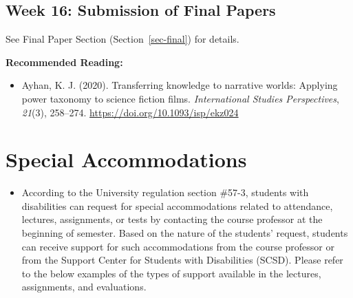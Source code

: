 \documentclass[
  letterpaper,
  DIV=11,
  numbers=noendperiod]{scrartcl}
\providecommand{\tightlist}{%
  \setlength{\itemsep}{0pt}\setlength{\parskip}{0pt}}\usepackage{longtable,booktabs,array}
\begin{document}
\hypertarget{week-16-submission-of-final-papers}{%
\subsection*{Week 16: Submission of Final
Papers}\label{week-16-submission-of-final-papers}}

See Final Paper Section (Section~\ref{sec-final}) for details.

\textbf{Recommended Reading:}

\begin{itemize}
\tightlist
\item
  Ayhan, K. J. (2020). Transferring knowledge to narrative worlds:
  Applying power taxonomy to science fiction films. \emph{International
  Studies Perspectives}, \emph{21}(3), 258--274.
  \url{https://doi.org/10.1093/isp/ekz024}
\end{itemize}

\hypertarget{special-accommodations}{%
\section{\texorpdfstring{{Special
Accommodations}}{Special Accommodations}}\label{special-accommodations}}

\begin{itemize}
\tightlist
\item
  According to the University regulation section \#57-3, students with
  disabilities can request for special accommodations related to
  attendance, lectures, assignments, or tests by contacting the course
  professor at the beginning of semester. Based on the nature of the
  students' request, students can receive support for such
  accommodations from the course professor or from the Support Center
  for Students with Disabilities (SCSD). Please refer to the below
  examples of the types of support available in the lectures,
  assignments, and evaluations.
\end{itemize}
\end{document}
